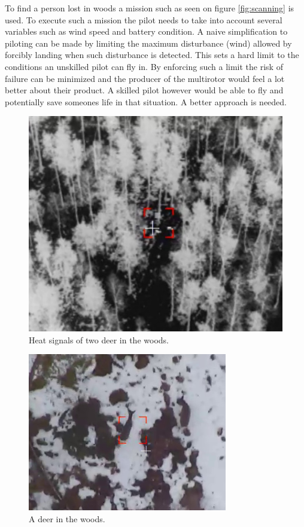 \documentclass[12pt,oneside]{reedthesis}
\theoremstyle{definition}
\theoremstyle{definition}
\theoremstyle{definition}
\theoremstyle{remark}
\begin{document}
To find a person lost in woods a mission such as seen on figure
\ref{fig:scanning} is used. To execute such a mission the pilot needs to
take into account several variables such as wind speed and battery
condition. A naive simplification to piloting can be made by limiting
the maximum disturbance (wind) allowed by forcibly landing when such
disturbance is detected. This sets a hard limit to the conditions an
unskilled pilot can fly in. By enforcing such a limit the risk of
failure can be minimized and the producer of the multirotor would feel a
lot better about their product. A skilled pilot however would be able to
fly and potentially save someones life in that situation. A better
approach is needed.
\begin{figure}
\centering
\includegraphics{./figure/twoDeer.PNG}
\caption[\label{fig:twoDeer}Heat signals of two deer in the
woods.]{\label{fig:twoDeer}Heat signals of two deer in the
woods.\footnotemark{}}
\end{figure}
\begin{figure}
\centering
\includegraphics{./figure/deer.PNG}
\caption[\label{fig:deer}A deer in the woods.]{\label{fig:deer}A deer in the
woods.\footnotemark{}}
\end{figure}
\end{document}
